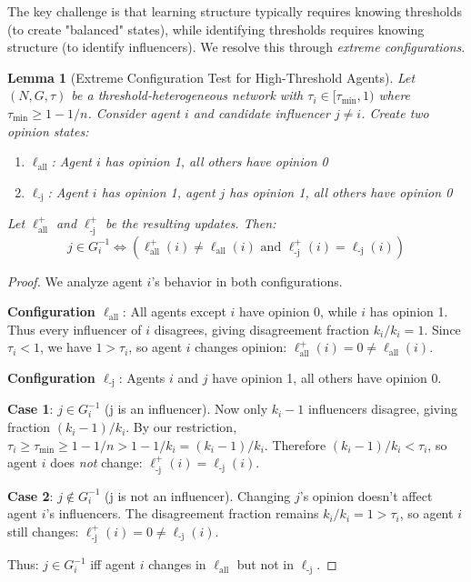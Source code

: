 \documentclass[conference]{IEEEtran}
\newtheorem{lemma}{Lemma}
\begin{document}
The key challenge is that learning structure typically requires knowing thresholds (to create "balanced" states), while identifying thresholds requires knowing structure (to identify influencers). We resolve this through \emph{extreme configurations}.

\begin{lemma}[Extreme Configuration Test for High-Threshold Agents]
\label{lem:extreme_config}
Let $(N, G, \tau)$ be a threshold-heterogeneous network with $\tau_i \in [\tau_{\min}, 1)$ where $\tau_{\min} \geq 1 - 1/n$. Consider agent $i$ and candidate influencer $j \neq i$. Create two opinion states:
\begin{enumerate}
\item $\ell_{\text{all}}$: Agent $i$ has opinion 1, all others have opinion 0
\item $\ell_{\text{-j}}$: Agent $i$ has opinion 1, agent $j$ has opinion 1, all others have opinion 0
\end{enumerate}
Let $\ell^+_{\text{all}}$ and $\ell^+_{\text{-j}}$ be the resulting updates. Then:
\[
j \in G^{-1}_i \iff \left(\ell^+_{\text{all}}(i) \neq \ell_{\text{all}}(i) \text{ and } \ell^+_{\text{-j}}(i) = \ell_{\text{-j}}(i)\right)
\]
\end{lemma}

\begin{proof}
We analyze agent $i$'s behavior in both configurations.

\textbf{Configuration $\ell_{\text{all}}$}: All agents except $i$ have opinion 0, while $i$ has opinion 1. Thus every influencer of $i$ disagrees, giving disagreement fraction $k_i/k_i = 1$. Since $\tau_i < 1$, we have $1 > \tau_i$, so agent $i$ changes opinion: $\ell^+_{\text{all}}(i) = 0 \neq \ell_{\text{all}}(i)$.

\textbf{Configuration $\ell_{\text{-j}}$}: Agents $i$ and $j$ have opinion 1, all others have opinion 0.

\textbf{Case 1}: $j \in G^{-1}_i$ (j is an influencer).
Now only $k_i - 1$ influencers disagree, giving fraction $(k_i - 1)/k_i$. By our restriction, $\tau_i \geq \tau_{\min} \geq 1 - 1/n > 1 - 1/k_i = (k_i-1)/k_i$. Therefore $(k_i-1)/k_i < \tau_i$, so agent $i$ does \emph{not} change: $\ell^+_{\text{-j}}(i) = \ell_{\text{-j}}(i)$.

\textbf{Case 2}: $j \notin G^{-1}_i$ (j is not an influencer).
Changing $j$'s opinion doesn't affect agent $i$'s influencers. The disagreement fraction remains $k_i/k_i = 1 > \tau_i$, so agent $i$ still changes: $\ell^+_{\text{-j}}(i) = 0 \neq \ell_{\text{-j}}(i)$.

Thus: $j \in G^{-1}_i$ iff agent $i$ changes in $\ell_{\text{all}}$ but not in $\ell_{\text{-j}}$.
\end{proof}
\end{document}
